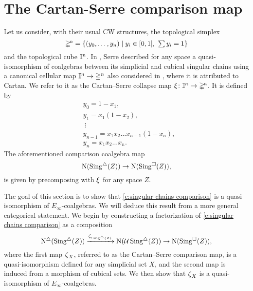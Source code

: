 
\section{The Cartan-Serre comparison map} \label{s:the cartan-serre comparison map}

Let us consider, with their usual CW structures, the topological simplex
\[
\mathbb{\Delta}^{\!n} = \{(y_0, \dots, y_n) \mid y_i \in [0,1], \ \textstyle{\sum} \, y_i = 1\}
\]
and the topological cube $\mathbb{I}^n$.
In \cite[p. 442]{serre1951homologie}, Serre described for any space a quasi-isomorphism of coalgebras between its simplicial and cubical singular chains using a canonical cellular map $\mathbb{I}^n \to \mathbb{\Delta}^n$ also considered in \cite[p.199]{eilenberg1953acyclic}, where it is attributed to Cartan.
We refer to it as the Cartan--Serre collapse map $\operatorname{\xi} \colon \mathbb{I}^n \to \mathbb{\Delta}^{\!n}$.
It is defined by
\begin{equation} \label{e:cartan-serre collapse map}
\begin{split}
&y_0 = 1 - x_1, \\
&y_1 = x_1(1 - x_2), \\
&\ \vdots \\
&y_{n-1} = x_1 x_2 \dots x_{n-1}(1-x_n), \\
&y_{n} = x_1 x_2 \dots x_n.
\end{split}
\end{equation}
The aforementioned comparison coalgebra map
\begin{equation} \label{e:singular chains comparison}
\operatorname{N}(\operatorname{Sing^{\triangle}}(Z)) \to
\operatorname{N}(\operatorname{Sing^{\square}}(Z)),
\end{equation}
is given by precomposing with $\operatorname{\xi}$ for any space $Z$.

The goal of this section is to show that \eqref{e:singular chains comparison} is a quasi-isomorphism of $E_\infty$-coalgebras.
We will deduce this result from a more general categorical statement.
We begin by constructing a factorization of \eqref{e:singular chains comparison} as a composition
\[
\operatorname{N^{\triangle}}(\operatorname{Sing^{\triangle}}(Z)) \xrightarrow{\operatorname{\zeta}_{\operatorname{Sing^{\triangle}}(Z)}}
\operatorname{N}(\operatorname{\mathcal{U}} \operatorname{Sing^{\triangle}}(Z)) \to
\operatorname{N}(\operatorname{Sing^{\square}}(Z)),
\]
where the first map $\operatorname{\zeta}_X$, referred to as the Cartan--Serre comparison map, is a quasi-isomorphism defined for any simplicial set $X$, and the second map is induced from a morphism of cubical sets.
We then show that $\operatorname{\zeta}_X$ is a quasi-isomorphism of $E_\infty$-coalgebras.

